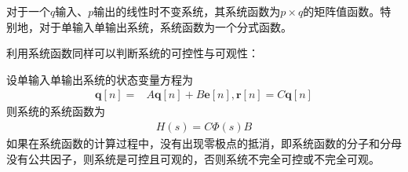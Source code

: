 对于一个$q$输入、$p$输出的线性时不变系统，其系统函数为$p\times q$的矩阵值函数。特别地，对于单输入单输出系统，系统函数为一个分式函数。

利用系统函数同样可以判断系统的可控性与可观性：

\begin{claim}
    设单输入单输出系统的状态变量方程为
    \begin{align*}
        \mathbf{q}[n]=&A\mathbf{q}[n]+B \mathbf{e}[n],\mathbf{r}[n]=C\mathbf{q}[n]
    \end{align*}
    则系统的系统函数为
    \begin{align*}
        H(s)=C\Phi(s)B
    \end{align*}
    如果在系统函数的计算过程中，没有出现零极点的抵消，即系统函数的分子和分母没有公共因子，则系统是可控且可观的，否则系统不完全可控或不完全可观。
\end{claim}
